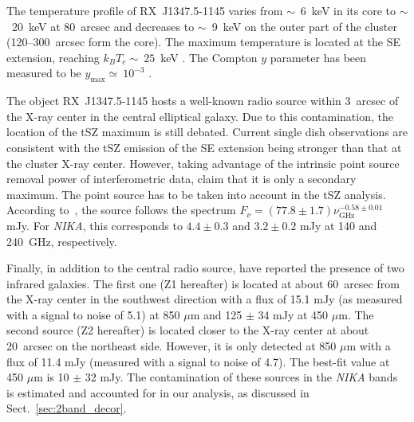 The temperature profile of RX~J1347.5-1145 varies from $\sim$~6~keV in its core to $\sim$~20~keV at 80~arcsec and decreases to $\sim$~9~keV on the outer part of the cluster (120--300~arcsec form the core). The maximum temperature is located at the SE extension, reaching $k_B T_e \sim~25$~keV \citep{ota_2008}. The Compton $y$ parameter has been measured to be $y_{\mathrm{max}} \simeq~10^{-3}$ \citep{pointecouteau_1999}.

The object RX~J1347.5-1145 hosts a well-known radio source within 3~arcsec of the \mbox{X-ray} center in the central elliptical galaxy. Due to this contamination, the location of the tSZ maximum is still debated. Current single dish observations are consistent with the tSZ emission of the SE extension being stronger than that at the cluster \mbox{X-ray} center. However, taking advantage of the intrinsic point source removal power of interferometric data, \cite{plagge_2012} claim that it is only a secondary maximum. The point source has to be taken into account in the tSZ analysis. According to~\cite{pointecouteau_2001}, the source follows the spectrum $F_{\nu} = \left(77.8 \pm 1.7\right) \nu_{\mathrm{GHz}}^{-0.58 \pm 0.01}$ mJy. For {\it NIKA}, this corresponds to $4.4 \pm 0.3$ and $3.2 \pm 0.2$ mJy at 140 and 240~GHz, respectively.

Finally, in addition to the central radio source, \cite{zemcov2007} have reported the presence of two infrared galaxies. The first one (Z1 hereafter) is located at about 60~arcsec from the \mbox{X-ray} center in the southwest direction with a flux of  15.1 mJy (as measured with a signal to noise of 5.1) at 850 $\mu$m and 125 $\pm$ 34  mJy at 450 $\mu$m. The second source (Z2 hereafter) is located closer to the \mbox{X-ray} center at about 20~arcsec on the northeast side. However, it is only detected at 850 $\mu$m with a flux of 11.4 mJy (measured with a signal to noise of 4.7). The best-fit value at 450 $\mu$m is 10  $\pm$ 32 mJy. The contamination of these sources in the {\it NIKA} bands is estimated and accounted for in our analysis, as discussed in Sect.~\ref{sec:2band_decor}.
